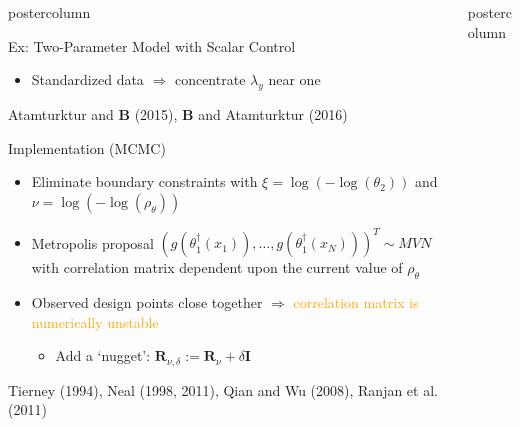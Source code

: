 \documentclass[final,10pt]{beamer}  %
\newlength{\columnheight}
\begin{document}
\begin{frame}{}
\begin{columns}[t]
\begin{column}{.33\textwidth}
\begin{beamercolorbox}[center,wd=1.325\textwidth]{postercolumn}
\begin{minipage}[T]{\textwidth}
{\begin{block}{Ex: Two-Parameter Model with Scalar Control}
{\begin{itemize}
            \item
            Standardized data $\Rightarrow$ concentrate $\lambda_y$ near one
        \end{itemize}

        }
            \hfill {\tiny Atamturktur and {\bf {\tiny B}} (2015), {\bf {\tiny B}} and Atamturktur (2016)}
        \end{block}
        \vfill


        \begin{block}{Implementation (MCMC)}
            {\small
            \begin{itemize}\itemsep2ex
            \item
            Eliminate boundary constraints with $\xi = \log(-\log(\theta_2))$ and $\nu = \log(-\log(\rho_{\theta}))$

            \item
            Metropolis proposal $(g(\theta_1^{\dagger}(x_1)), \ldots, g(\theta_1^{\dagger}(x_N)))^T \sim MVN$ with correlation matrix dependent upon the current value of $\rho_{\theta}$


            \item
            Observed design points close together $\Rightarrow$ \textcolor{orange}{correlation matrix is numerically unstable}
            \begin{itemize}
                \item
                Add a `nugget': $\mathbf{R}_{\nu, \delta} := \mathbf{R}_{\nu} + \delta\mathbf{I}$

            \end{itemize}

            \end{itemize}
          \hfill {\tiny Tierney (1994), Neal (1998, 2011), Qian and Wu (2008), Ranjan et al. (2011)}
        }
        \end{block}
        \vfill
        } %
        \end{minipage}
        \end{beamercolorbox}
    \end{column}

    \begin{column}{.33\textwidth}
    \begin{beamercolorbox}[center,wd=1.475\textwidth]{postercolumn}
    \begin{minipage}[T]{\textwidth}
    \parbox[t][\columnheight]{\textwidth}{ %

}
\end{minipage}
\end{beamercolorbox}
\end{column}
\end{columns}
\end{frame}
\end{document}
